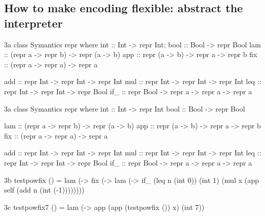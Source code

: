 \subsection{How to make encoding flexible: abstract the interpreter}
\label{encoding}

\ifshort
\begin{SaveVerbatim}{3a}
class Symantics repr where
  int :: Int  -> repr Int;       bool :: Bool -> repr Bool
  lam :: (repr a -> repr b) -> repr (a -> b)
  app :: repr (a -> b) -> repr a -> repr b
  fix :: (repr a -> repr a) -> repr a

  add :: repr Int -> repr Int -> repr Int
  mul :: repr Int -> repr Int -> repr Int
  leq :: repr Int -> repr Int -> repr Bool
  if_ :: repr Bool -> repr a -> repr a -> repr a
\end{SaveVerbatim}
\else
\begin{SaveVerbatim}{3a}
class Symantics repr where
  int  :: Int  -> repr Int
  bool :: Bool -> repr Bool

  lam :: (repr a -> repr b) -> repr (a -> b)
  app :: repr (a -> b) -> repr a -> repr b
  fix :: (repr a -> repr a) -> repr a

  add :: repr Int -> repr Int -> repr Int
  mul :: repr Int -> repr Int -> repr Int
  leq :: repr Int -> repr Int -> repr Bool
  if_ :: repr Bool -> repr a -> repr a -> repr a
\end{SaveVerbatim}
\fi
\begin{SaveVerbatim}{3b}
testpowfix () = lam (\x -> fix (\self -> lam (\n ->
                 if_ (leq n (int 0)) (int 1)
                     (mul x (app self (add n (int (-1))))))))
\end{SaveVerbatim}
\begin{SaveVerbatim}{3c}
testpowfix7 () = lam (\x -> app (app (testpowfix ()) x) (int 7))
\end{SaveVerbatim}

